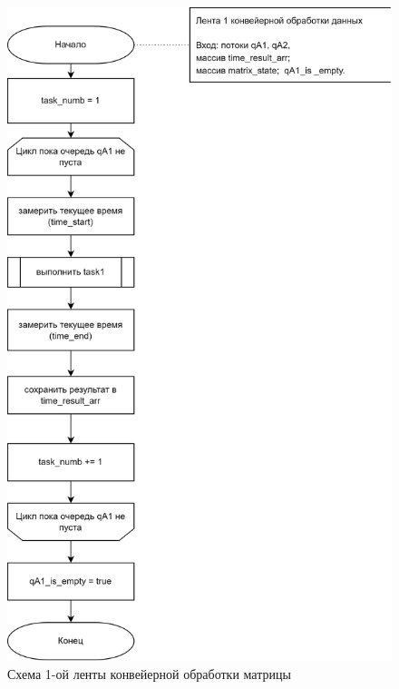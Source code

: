 \begin{figure}[h]
	\centering
	\includegraphics[scale=0.2]{img/parallel_stage_1.png}
	\caption{Схема 1-ой ленты конвейерной обработки матрицы}
	\label{fig:parallel_stage_1}
\end{figure} 

\clearpage


